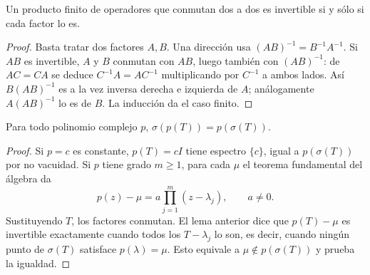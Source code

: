 \begin{lema}\label{v3:producto-conmutativo}
Un producto finito de operadores que conmutan dos a dos es invertible si y sólo si cada factor lo es.
\end{lema}
\begin{proof}
Basta tratar dos factores $A,B$. Una dirección usa $(AB)^{-1}=B^{-1}A^{-1}$. Si $AB$ es invertible, $A$ y $B$ conmutan con $AB$, luego también con $(AB)^{-1}$: de $AC=CA$ se deduce $C^{-1}A=AC^{-1}$ multiplicando por $C^{-1}$ a ambos lados. Así $B(AB)^{-1}$ es a la vez inversa derecha e izquierda de $A$; análogamente $A(AB)^{-1}$ lo es de $B$. La inducción da el caso finito.
\end{proof}

\begin{teorema}\label{v3:espectral-polinomios}
Para todo polinomio complejo $p$, $\sigma(p(T))=p(\sigma(T))$.
\end{teorema}
\begin{proof}
Si $p=c$ es constante, $p(T)=cI$ tiene espectro $\{c\}$, igual a $p(\sigma(T))$ por no vacuidad. Si $p$ tiene grado $m\ge1$, para cada $\mu$ el teorema fundamental del álgebra da
\[p(z)-\mu=a\prod_{j=1}^m(z-\lambda_j),\qquad a\ne0.
\]
Sustituyendo $T$, los factores conmutan. El lema anterior dice que $p(T)-\mu$ es invertible exactamente cuando todos los $T-\lambda_j$ lo son, es decir, cuando ningún punto de $\sigma(T)$ satisface $p(\lambda)=\mu$. Esto equivale a $\mu\notin p(\sigma(T))$ y prueba la igualdad.
\end{proof}

